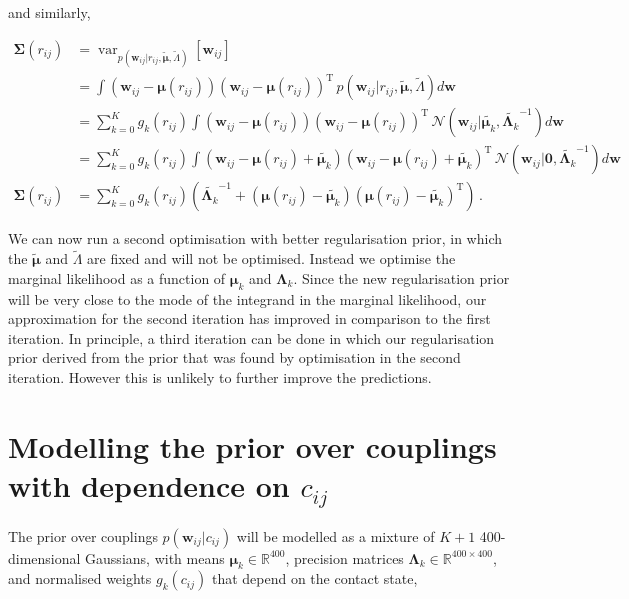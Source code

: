 \documentclass[11pt,a4paper,twoside]{book}
\newcommand{\Gauss}{\mathcal{N}}
\newcommand{\Lk}{\mathbf{\Lambda}_k}
\newcommand{\muk}{\mathbf{\mu}_k}
\newcommand{\rij}{r_{ij}}
\newcommand{\cij}{c_{ij}}
\newcommand{\w}{\mathbf{w}}
\newcommand{\wij}{\mathbf{w}_{ij}}
\theoremstyle{definition}
\theoremstyle{definition}
\theoremstyle{remark}
\begin{document}
and similarly,

\begin{align}
    \mathbf{\Sigma}(r_{ij}) &= \operatorname{var}_{ p(\wij | \rij, \tilde{\mathbf{\mu}}, \tilde{\Lambda} )}  \left[ \wij \right] \\
    &= \int (\wij - \mathbf{\mu}(r_{ij})) (\wij - \mathbf{\mu}(r_{ij}))^\mathrm{T} \, p( \wij | \rij, \tilde{\mathbf{\mu}}, \tilde{\Lambda}) d \w \\
    &= \sum_{k=0}^K g_k(\rij) \int  (\wij - \mathbf{\mu}(r_{ij})) (\wij - \mathbf{\mu}(r_{ij}))^\mathrm{T} \, \Gauss(\wij | \tilde{\muk}, \tilde{\Lk}^{-1}) d \w \\
    &= \sum_{k=0}^K g_k(\rij) \int  (\wij - \mathbf{\mu}(r_{ij}) + \tilde{\muk}) (\wij - \mathbf{\mu}(r_{ij}) + \tilde{\muk})^\mathrm{T} \, \Gauss(\wij | \mathbf{0} , \tilde{\Lk}^{-1}) d \w \\
    \mathbf{\Sigma}(r_{ij}) &= \sum_{k=0}^K g_k(\rij) \left( \tilde{\Lk}^{-1} + (\mathbf{\mu}(r_{ij}) - \tilde{\muk}) (\mathbf{\mu}(r_{ij}) - \tilde{\muk})^\mathrm{T}\right) \,. 
\end{align}

We can now run a second optimisation with better regularisation prior,
in which the \(\tilde{\mathbf{\mu}}\) and \(\tilde{\Lambda}\) are fixed
and will not be optimised. Instead we optimise the marginal likelihood
as a function of \(\muk\) and \(\Lk\). Since the new regularisation
prior will be very close to the mode of the integrand in the marginal
likelihood, our approximation for the second iteration has improved in
comparison to the first iteration. In principle, a third iteration can
be done in which our regularisation prior derived from the prior that
was found by optimisation in the second iteration. However this is
unlikely to further improve the predictions.

\section{\texorpdfstring{Modelling the prior over couplings with
dependence on
\(\cij\)}{Modelling the prior over couplings with dependence on \textbackslash{}cij}}\label{coupling-prior}

The prior over couplings \(p(\wij|\cij)\) will be modelled as a mixture
of \(K\!+\!1\) 400-dimensional Gaussians, with means
\(\muk \in \mathbb{R}^{400}\), precision matrices
\(\Lk \in \mathbb{R}^{400\times 400}\), and normalised weights
\(g_k(\cij)\) that depend on the contact state,
\end{document}

